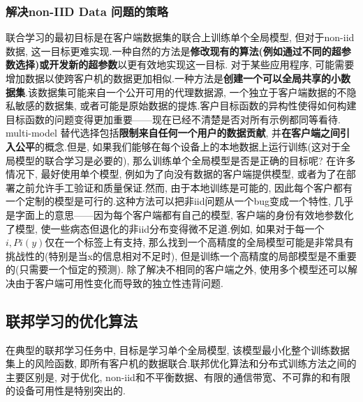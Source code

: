 \documentclass[a4paper]{article}
\theoremstyle{definition}
\numberwithin{equation}{section}
\begin{document}
\subsubsection{解决non-IID Data 问题的策略}
联合学习的最初目标是在客户端数据集的联合上训练单个全局模型, 但对于non-iid数据, 这一目标更难实现.一种自然的方法是\textbf{修改现有的算法(例如通过不同的超参数选择)或开发新的超参数}以更有效地实现这一目标.
对于某些应用程序, 可能需要增加数据以使跨客户机的数据更加相似.一种方法是\textbf{创建一个可以全局共享的小数据集}.该数据集可能来自一个公开可用的代理数据源, 一个独立于客户端数据的不隐私敏感的数据集, 或者可能是原始数据的提炼.客户目标函数的异构性使得如何构建目标函数的问题变得更加重要——现在已经不清楚是否对所有示例都同等看待.
multi-model
替代选择包括\textbf{限制来自任何一个用户的数据贡献}, 并\textbf{在客户端之间引入公平}的概念.但是, 如果我们能够在每个设备上的本地数据上运行训练(这对于全局模型的联合学习是必要的), 那么训练单个全局模型是否是正确的目标呢? 
在许多情况下, 最好使用单个模型, 例如为了向没有数据的客户端提供模型, 或者为了在部署之前允许手工验证和质量保证.然而, 由于本地训练是可能的, 因此每个客户都有一个定制的模型是可行的.这种方法可以把非iid问题从一个bug变成一个特性, 几乎是字面上的意思——因为每个客户端都有自己的模型, 客户端的身份有效地参数化了模型, 使一些病态但退化的非iid分布变得微不足道.例如, 如果对于每一个$i,  Pi(y)$仅在一个标签上有支持, 那么找到一个高精度的全局模型可能是非常具有挑战性的(特别是当x的信息相对不足时), 但是训练一个高精度的局部模型是不重要的(只需要一个恒定的预测). 
除了解决不相同的客户端之外, 使用多个模型还可以解决由于客户端可用性变化而导致的独立性违背问题.
\subsection{联邦学习的优化算法}
在典型的联邦学习任务中, 目标是学习单个全局模型, 该模型最小化整个训练数据集上的风险函数, 即所有客户机的数据联合.联邦优化算法和分布式训练方法之间的主要区别是, 对于优化, non-iid和不平衡数据、有限的通信带宽、不可靠的和有限的设备可用性是特别突出的.
\end{document}
